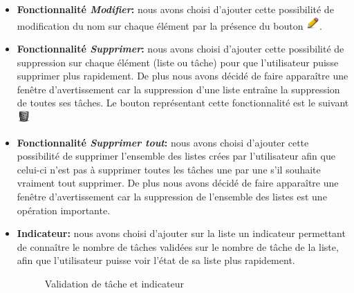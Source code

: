 \documentclass[a4paper,10pt]{article}
\begin{document}
\begin{itemize}
\item \textbf{Fonctionnalité \textit{Modifier}:} nous avons choisi d'ajouter cette possibilité de modification du nom sur chaque élément par la présence du bouton \includegraphics[width=0.5cm]{Images/modify.png}.
\item \textbf{Fonctionnalité \textit{Supprimer}:} nous avons choisi d'ajouter cette possibilité de suppression sur chaque élément (liste ou tâche) pour que l'utilisateur puisse supprimer plus rapidement. De  plus nous avons décidé de faire apparaître une fenêtre d'avertissement car la suppression d'une liste entraîne la suppression de toutes ses tâches. Le bouton représentant cette fonctionnalité est le suivant \includegraphics[width=0.5cm]{Images/trash_empty.png}
\item \textbf{Fonctionnalité \textit{Supprimer tout}:} nous avons choisi d'ajouter cette possibilité de supprimer l'ensemble des listes crées par l'utilisateur afin que celui-ci n'est pas à supprimer toutes les tâches une par une s'il souhaite vraiment tout supprimer. De  plus nous avons décidé de faire apparaître une fenêtre d'avertissement car la suppression de l'ensemble des listes est une opération importante.
\item \textbf{Indicateur:} nous avons choisi d'ajouter sur la liste un indicateur permettant de connaître le nombre de tâches validées sur le nombre de tâche de la liste, afin que l'utilisateur puisse voir l'état de sa liste plus rapidement.
\begin{figure}[H]
    \center
     \quad
    \caption{Validation de tâche et indicateur}
\end{figure}
\end{itemize}
\end{document}

